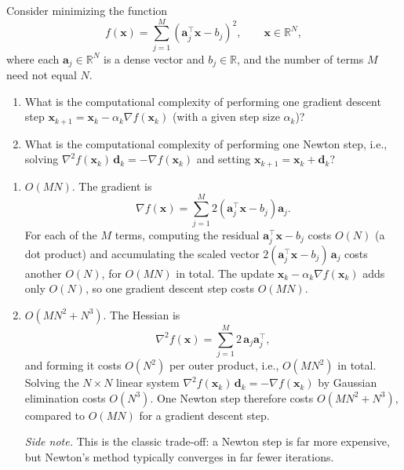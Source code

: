 \begin{exercise} %
    
    Consider minimizing the function
    \[
        f(\mathbf{x}) = \sum_{j=1}^{M} \left( \mathbf{a}_j^\top \mathbf{x} - b_j \right)^2, \qquad \mathbf{x} \in \mathbb{R}^N,
    \]
    where each $\mathbf{a}_j \in \mathbb{R}^N$ is a dense vector and $b_j \in \mathbb{R}$, and the number of terms $M$ need not equal $N$.
    \begin{enumerate}[label=(\alph*)]
        \item What is the computational complexity of performing one gradient descent step $\mathbf{x}_{k+1} = \mathbf{x}_k - \alpha_k \nabla f(\mathbf{x}_k)$ (with a given step size $\alpha_k$)?
        \item What is the computational complexity of performing one Newton step, i.e., solving $\nabla^2 f(\mathbf{x}_k)\, \mathbf{d}_k = -\nabla f(\mathbf{x}_k)$ and setting $\mathbf{x}_{k+1} = \mathbf{x}_k + \mathbf{d}_k$?
    \end{enumerate}
    
\end{exercise}

\begin{solution}
    
    \begin{enumerate}[label=(\alph*)]
        \item $O(MN)$. The gradient is
        \[
            \nabla f(\mathbf{x}) = \sum_{j=1}^{M} 2 \left( \mathbf{a}_j^\top \mathbf{x} - b_j \right) \mathbf{a}_j.
        \]
        For each of the $M$ terms, computing the residual $\mathbf{a}_j^\top \mathbf{x} - b_j$ costs $O(N)$ (a dot product) and accumulating the scaled vector $2(\mathbf{a}_j^\top \mathbf{x} - b_j)\, \mathbf{a}_j$ costs another $O(N)$, for $O(MN)$ in total. The update $\mathbf{x}_k - \alpha_k \nabla f(\mathbf{x}_k)$ adds only $O(N)$, so one gradient descent step costs $O(MN)$.
        \item $O(MN^2 + N^3)$. The Hessian is
        \[
            \nabla^2 f(\mathbf{x}) = \sum_{j=1}^{M} 2\, \mathbf{a}_j \mathbf{a}_j^\top,
        \]
        and forming it costs $O(N^2)$ per outer product, i.e., $O(MN^2)$ in total. Solving the $N \times N$ linear system $\nabla^2 f(\mathbf{x}_k)\, \mathbf{d}_k = -\nabla f(\mathbf{x}_k)$ by Gaussian elimination costs $O(N^3)$. One Newton step therefore costs $O(MN^2 + N^3)$, compared to $O(MN)$ for a gradient descent step.

        \emph{Side note.} This is the classic trade-off: a Newton step is far more expensive, but Newton's method typically converges in far fewer iterations.
    \end{enumerate}
    
\end{solution}


